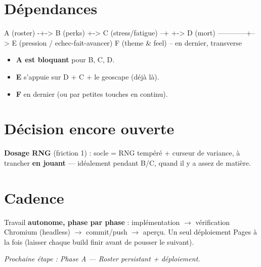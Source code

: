 \documentclass[11pt,a4paper]{article}
\begin{document}
\section{Dépendances}
\begin{code}
A (roster) -+-> B (perks)
            +-> C (stress/fatigue) --+
            +-> D (mort) ------------+--> E (pression / echec-fait-avancer)
                                         F (theme & feel) -- en dernier, transverse
\end{code}
\begin{itemize}
\item \textbf{A est bloquant} pour B, C, D.
\item \textbf{E} s'appuie sur D + C + le geoscape (déjà là).
\item \textbf{F} en dernier (ou par petites touches en continu).
\end{itemize}

\section{Décision encore ouverte}
\begin{openbox}
\textbf{Dosage RNG} (friction 1) : socle = RNG tempéré + curseur de variance, à trancher \textbf{en jouant} --- idéalement pendant B/C, quand il y a assez de matière.
\end{openbox}

\section{Cadence}
Travail \textbf{autonome, phase par phase} : implémentation $\to$ vérification Chromium (headless) $\to$ commit/push $\to$ aperçu. Un seul déploiement Pages à la fois (laisser chaque build finir avant de pousser le suivant).

\begin{center}\itshape Prochaine étape : Phase A --- Roster persistant + déploiement.\end{center}
\end{document}
